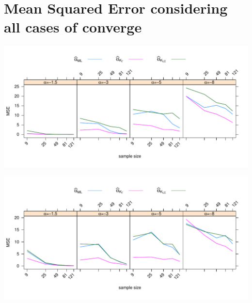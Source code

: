 \documentclass[10pt,a4paper]{article}
\begin{document}
\vspace{0.5cm}

\section{Mean Squared Error considering all cases of converge}

\vspace{1cm}

\begin{minipage}{0.5\linewidth}
	\includegraphics[width=\linewidth]{../../../Figures/OtroPaper/ConGeneraGIAlfaGamma/ECM500_sinmenos20NoCont_MVyNG1yLC_MetAnt_L3.pdf}
\end{minipage}	
\;	
\begin{minipage}{0.5\linewidth}	
	\includegraphics[width=\linewidth]{../../../Figures/OtroPaper/ConGeneraGIAlfaGamma/ECM500_sinmenos20NoCont_MVyNG1yLC_gamma10barrasdeerror_L3.pdf}
\end{minipage}	
\end{document}
